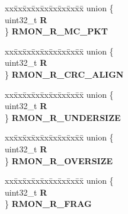 \begin{DoxyCompactItemize}
\begin{tabbing}
\end{tabbing}\item 
\mbox{\label{structFEC__tag_a20d333de3a2e68de1cddad65a6ac9d86}} 
\begin{tabbing}
xx\=xx\=xx\=xx\=xx\=xx\=xx\=xx\=xx\=\kill
union \{\\
\>uint32\_t {\bfseries R}\\
\} {\bfseries RMON\_R\_MC\_PKT}\\

\end{tabbing}\item 
\mbox{\label{structFEC__tag_ad878571a15304d44f3c2bd97ac424087}} 
\begin{tabbing}
xx\=xx\=xx\=xx\=xx\=xx\=xx\=xx\=xx\=\kill
union \{\\
\>uint32\_t {\bfseries R}\\
\} {\bfseries RMON\_R\_CRC\_ALIGN}\\

\end{tabbing}\item 
\mbox{\label{structFEC__tag_aa02b9cb22e281316474f38ae712361c3}} 
\begin{tabbing}
xx\=xx\=xx\=xx\=xx\=xx\=xx\=xx\=xx\=\kill
union \{\\
\>uint32\_t {\bfseries R}\\
\} {\bfseries RMON\_R\_UNDERSIZE}\\

\end{tabbing}\item 
\mbox{\label{structFEC__tag_a57b615a83bd2187fc90de35167e501ea}} 
\begin{tabbing}
xx\=xx\=xx\=xx\=xx\=xx\=xx\=xx\=xx\=\kill
union \{\\
\>uint32\_t {\bfseries R}\\
\} {\bfseries RMON\_R\_OVERSIZE}\\

\end{tabbing}\item 
\mbox{\label{structFEC__tag_aa2fb8b18cf8694a123bf2b1d284e6696}} 
\begin{tabbing}
xx\=xx\=xx\=xx\=xx\=xx\=xx\=xx\=xx\=\kill
union \{\\
\>uint32\_t {\bfseries R}\\
\} {\bfseries RMON\_R\_FRAG}\\


\end{tabbing}
\end{DoxyCompactItemize}
